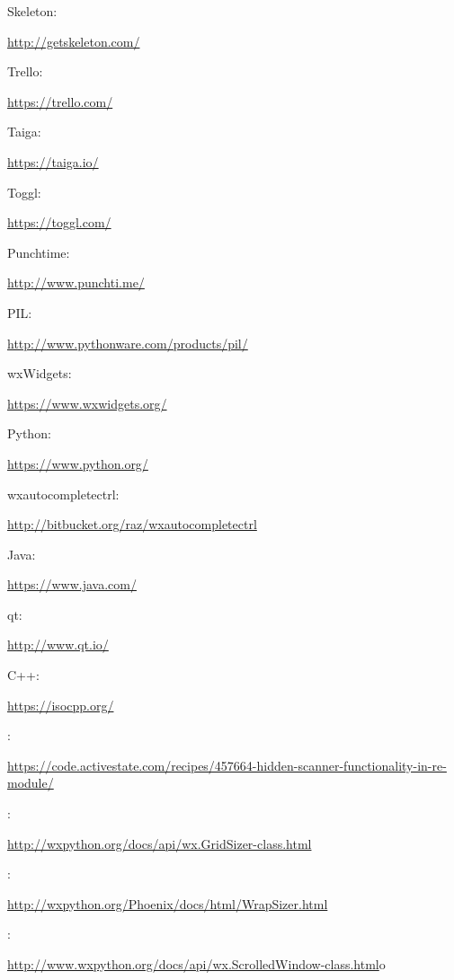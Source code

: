 \documentclass[12pt,a4paper,naustrian,english,oneside,openright,DIV=12,BCOR=1cm]{scrbook}
\begin{document}

\begin{thebibliography}{999}
	
	 Skeleton:
  
 	\url{http://getskeleton.com/}	
	
	 Trello: 
	 
	\url{https://trello.com/}
	
	 Taiga:  
	
	\url{https://taiga.io/}
	
	 Toggl: 
	 
	\url{https://toggl.com/}
	
	 Punchtime:  
	
	\url{http://www.punchti.me/}
	
	 PIL:  
	
	\url{http://www.pythonware.com/products/pil/}
	
	 wxWidgets:  
	
	\url{https://www.wxwidgets.org/}
	
	 Python:  
	
	\url{https://www.python.org/}
	
	 wxautocompletectrl: 
	 
	\url{http://bitbucket.org/raz/wxautocompletectrl}
	
	 Java:  
	
	\url{https://www.java.com/}
	
	 qt:  
	
	\url{http://www.qt.io/}
	
	 C++: 
	 
	\url{https://isocpp.org/}

	 :

	\url{https://code.activestate.com/recipes/457664-hidden-scanner-functionality-in-re-module/}

	 :

	\url{http://wxpython.org/docs/api/wx.GridSizer-class.html}

	 :

	\url{http://wxpython.org/Phoenix/docs/html/WrapSizer.html}

	 :

	\url{http://www.wxpython.org/docs/api/wx.ScrolledWindow-class.html}o
	

\end{thebibliography}
\end{document}
